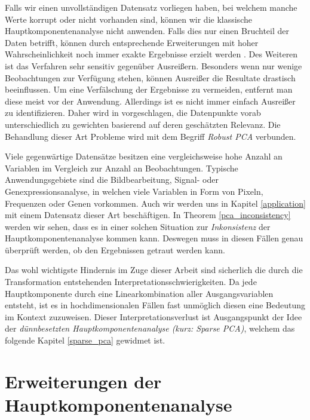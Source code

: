 Falls wir einen unvollständigen Datensatz vorliegen haben, bei welchem manche Werte korrupt oder nicht vorhanden sind, können wir die klassische Hauptkomponentenanalyse nicht anwenden. Falls dies nur einen Bruchteil der Daten betrifft, können durch entsprechende Erweiterungen mit hoher Wahrscheinlichkeit noch immer exakte Ergebnisse erzielt werden \cite{candes}. Des Weiteren ist das Verfahren sehr sensitiv gegenüber Ausreißern. Besonders wenn nur wenige Beobachtungen zur Verfügung stehen, können Ausreißer die Resultate drastisch beeinflussen. Um eine Verfälschung der Ergebnisse zu vermeiden, entfernt man diese meist vor der Anwendung. Allerdings ist es nicht immer einfach Ausreißer zu identifizieren. Daher wird in \cite{kriegel} vorgeschlagen, die Datenpunkte vorab unterschiedlich zu gewichten basierend auf deren geschätzten Relevanz. Die Behandlung dieser Art Probleme wird mit dem Begriff \textit{Robust PCA} verbunden.

Viele gegenwärtige Datensätze besitzen eine vergleichsweise hohe Anzahl an Variablen im Vergleich zur Anzahl an Beobachtungen. Typische Anwendungsgebiete sind die Bildbearbeitung, Signal- oder  Genexpressionsanalyse, in welchen viele Variablen in Form von Pixeln, Frequenzen oder Genen vorkommen. Auch wir werden uns in Kapitel \ref{application} mit einem Datensatz dieser Art beschäftigen. In Theorem \ref{pca_inconsistency} werden wir sehen, dass es in einer solchen Situation zur \textit{Inkonsistenz} der Hauptkomponentenanalyse kommen kann. Deswegen muss in diesen Fällen genau überprüft werden, ob den Ergebnissen getraut werden kann.

Das wohl wichtigste Hindernis im Zuge dieser Arbeit sind sicherlich die durch die Transformation entstehenden Interpretationsschwierigkeiten. Da jede Hauptkomponente durch eine Linearkombination aller Ausgangsvariablen entsteht, ist es in hochdimensionalen Fällen fast unmöglich diesen eine Bedeutung im Kontext zuzuweisen. Dieser Interpretationsverlust ist Ausgangspunkt der Idee der \textit{dünnbesetzten Hauptkomponentenanalyse (kurz: {Sparse PCA})}, welchem das folgende Kapitel \ref{sparse_pca} gewidmet ist.




\section{Erweiterungen der Hauptkomponentenanalyse}
\label{pca_extensions}

